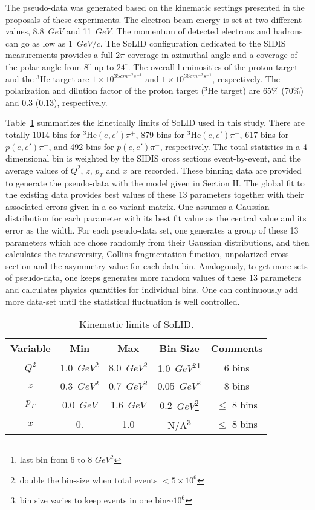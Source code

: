 \documentclass[twocolumn,showpacs,preprintnumbers,amsmath,amssymb,floatfix,prd]{revtex4}
\begin{document}
The pseudo-data was generated based on the kinematic settings presented in the proposals of these experiments. The electron beam energy is set at two different values, 8.8~$GeV$ and 11~$GeV$. The momentum of detected electrons and hadrons can go as low as 1~$GeV/c$. The SoLID configuration dedicated to the SIDIS measurements provides a full $2\pi$ coverage in azimuthal angle and a coverage of the polar angle from $8^{\circ}$ up to $24^{\circ}$.  The overall luminosities of the proton target and the $\mathrm{^{3}He}$ target are  $1\times 10^{35 cm^{-2}s^{-1}}$ and $1\times 10^{36 cm^{-2}s^{-1}}$, respectively.  The polarization and dilution factor of the proton target ($\mathrm{^{3}He}$ target) are 65\% (70\%) and 0.3 (0.13), respectively. 

Table~\ref{tab:kinem} summarizes the kinetically limits of SoLID used in this study. There are totally 1014 bins for $\mathrm{^{3}He}(e,e')\pi^{+}$, 879 bins for $\mathrm{^{3}He}(e,e')\pi^{-}$, 617 bins for $p(e,e')\pi^{-}$, and 492 bins for $p(e,e')\pi^{-}$, respectively. The total statistics in a 4-dimensional bin is weighted by the SIDIS cross sections event-by-event, and the average values of  $Q^{2}$, $z$, $p_{T}$ and $x$ are recorded. These binning data are provided to generate the pseudo-data with the model given in Section II. The global fit to the existing data provides best values of these 13 parameters together with their associated errors given in a co-variant matrix. One assumes a Gaussian distribution for each parameter with its best fit value as the central value and its error as the width. For each pseudo-data set, one generates a group of these 13 parameters which are chose randomly from their Gaussian distributions, and then calculates the transversity, Collins fragmentation function, unpolarized cross section and the asymmetry value for each data bin. Analogously, to get more sets of pseudo-data, one keeps generates more random values of these 13 parameters and calculates physics quantities for individual bins. One can continuously add  more data-set until the statistical fluctuation is well controlled.
  
 


\begin{table}[bth!]
\begin{tabular}{|c|c|c|c|c|}
\hline
Variable      & Min  & Max & Bin Size & Comments  \\ \hline
  $Q^{2}$    & 1.0~$GeV^{2}$  & 8.0~$GeV^{2}$  & 1.0~$GeV^{2}$\footnote{last bin from 6 to 8 $GeV^{2}$}   & 6 bins\\
  $z$           &  0.3~$GeV^{2}$ & 0.7~$GeV^{2}$  & 0.05~$GeV^{2}$ & 8 bins\\
  $p_{T}$    &  0.0~$GeV$ &  1.6~$GeV$&  0.2~$GeV$\footnote{double the bin-size when total events $<5\times 10^{6}$}& $\leq$ 8 bins \\
  $x$           & 0. & 1.0 & N/A\footnote{bin size varies to keep events in one bin$\sim10^{6}$} &  $\leq$ 8 bins \\\hline
\end{tabular}
\caption{\label{tab:kinem} Kinematic limits of SoLID.}
\end{table}
%
\end{document}

